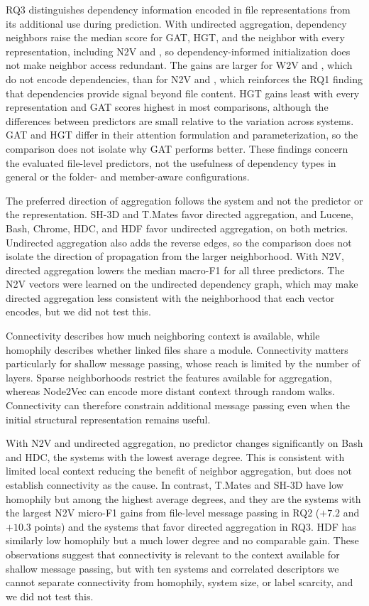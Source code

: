 RQ3 distinguishes dependency information encoded in file representations from its additional use during prediction. With undirected aggregation, dependency neighbors raise the median score for GAT, HGT, and the neighbor \mlp{} with every representation, including N2V and \ft{}, so dependency-informed initialization does not make neighbor access redundant. The gains are larger for W2V and \zs{}, which do not encode dependencies, than for N2V and \ft{}, which reinforces the RQ1 finding that dependencies provide signal beyond file content. HGT gains least with every representation and GAT scores highest in most comparisons, although the differences between predictors are small relative to the variation across systems. GAT and HGT differ in their attention formulation and parameterization, so the comparison does not isolate why GAT performs better. These findings concern the evaluated file-level predictors, not the usefulness of dependency types in general or the folder- and member-aware configurations.

The preferred direction of aggregation follows the system and not the predictor or the representation. SH-3D and T.Mates favor directed aggregation, and Lucene, Bash, Chrome, HDC, and HDF favor undirected aggregation, on both metrics. Undirected aggregation also adds the reverse edges, so the comparison does not isolate the direction of propagation from the larger neighborhood. With N2V, directed aggregation lowers the median macro-F1 for all three predictors. The N2V vectors were learned on the undirected dependency graph, which may make directed aggregation less consistent with the neighborhood that each vector encodes, but we did not test this.

Connectivity describes how much neighboring context is available, while homophily describes whether linked files share a module. Connectivity matters particularly for shallow message passing, whose reach is limited by the number of layers. Sparse neighborhoods restrict the features available for aggregation, whereas Node2Vec can encode more distant context through random walks. Connectivity can therefore constrain additional message passing even when the initial structural representation remains useful.

With N2V and undirected aggregation, no predictor changes significantly on Bash and HDC, the systems with the lowest average degree. This is consistent with limited local context reducing the benefit of neighbor aggregation, but does not establish connectivity as the cause. In contrast, T.Mates and SH-3D have low homophily but among the highest average degrees, and they are the systems with the largest N2V micro-F1 gains from file-level message passing in RQ2 ($+7.2$ and $+10.3$ points) and the systems that favor directed aggregation in RQ3. HDF has similarly low homophily but a much lower degree and no comparable gain. These observations suggest that connectivity is relevant to the context available for shallow message passing, but with ten systems and correlated descriptors we cannot separate connectivity from homophily, system size, or label scarcity, and we did not test this.

